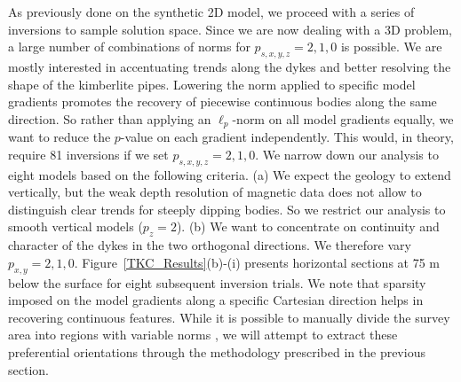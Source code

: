 \documentclass[extra,referee]{gji}
\begin{document}
As previously done on the synthetic 2D model, we proceed with a series of inversions to sample solution space. Since we are now dealing with a 3D problem, a large number of combinations of norms for $p_{s,x,y,z}=2,1,0$ is possible. We are mostly interested in accentuating trends along the dykes and better resolving the shape of the kimberlite pipes. Lowering the norm applied to specific model gradients promotes the recovery of piecewise continuous bodies along the same direction. So rather than applying an $\ell_p$-norm on all model gradients equally, we want to reduce the $p$-value on each gradient independently. This would, in theory, require 81 inversions if we set $p_{s,x,y,z}=2,1,0$.
We narrow down our analysis to eight models based on the following criteria.
(a) We expect the geology to extend vertically, but the weak depth resolution of magnetic data does not allow to distinguish clear trends for steeply dipping bodies. So we restrict our analysis to smooth vertical models ($p_z=2$).
(b) We want to concentrate on continuity and character of the dykes in the two orthogonal directions. We therefore vary $p_{x,y}=2,1,0$. Figure~\ref{TKC_Results}(b)-(i) presents horizontal sections at 75 m below the surface for eight subsequent inversion trials.
We note that sparsity imposed on the model gradients along a specific Cartesian direction helps in recovering continuous features.
While it is possible to manually divide the survey area into regions with variable norms \cite[]{FournierDavis2016a}, we will attempt to extract these preferential orientations through the methodology prescribed in the previous section.
\end{document}
